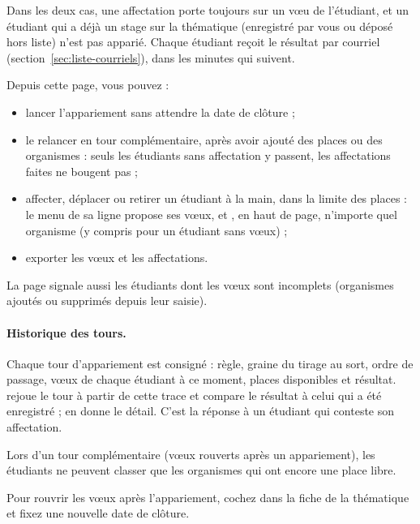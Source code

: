 \documentclass[11pt,a4paper]{article}
\begin{document}
Dans les deux cas, une affectation porte toujours sur un vœu de l'étudiant, et un
étudiant qui a déjà un stage sur la thématique (enregistré par vous ou déposé
hors liste) n'est pas apparié. Chaque étudiant reçoit le résultat par courriel
(section~\ref{sec:liste-courriels}), dans les minutes qui suivent.


Depuis cette page, vous pouvez :

\begin{itemize}
  \item lancer l'appariement sans attendre la date de clôture ;
  \item le relancer en tour complémentaire, après avoir ajouté des places ou des
        organismes : seuls les étudiants sans affectation y passent, les
        affectations faites ne bougent pas ;
  \item affecter, déplacer ou retirer un étudiant à la main, dans la limite des
        places : le menu de sa ligne propose ses vœux, et , en haut de page, n'importe quel organisme (y compris pour un
        étudiant sans vœux) ;
  \item exporter les vœux et les affectations.
\end{itemize}

La page signale aussi les étudiants dont les vœux sont incomplets (organismes
ajoutés ou supprimés depuis leur saisie).

\paragraph{Historique des tours.} Chaque tour d'appariement est consigné :
règle, graine du tirage au sort, ordre de passage, vœux de chaque étudiant à ce
moment, places disponibles et résultat.  rejoue le tour à partir
de cette trace et compare le résultat à celui qui a été enregistré ;
 en donne le détail. C'est la réponse à un étudiant qui
conteste son affectation.


Lors d'un tour complémentaire (vœux rouverts après un appariement), les
étudiants ne peuvent classer que les organismes qui ont encore une place libre.

Pour rouvrir les vœux après l'appariement, cochez  dans
la fiche de la thématique et fixez une nouvelle date de clôture.
\end{document}
